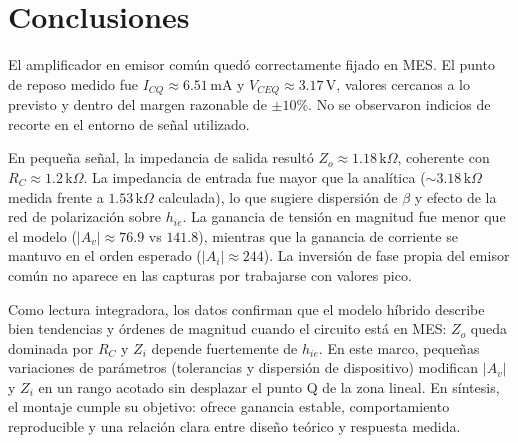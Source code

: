 \chapter{Conclusiones}
El amplificador en emisor común quedó correctamente fijado en MES. El punto de reposo medido fue \(I_{CQ}\approx 6.51\,
\mathrm{mA}\) y \(V_{CEQ}\approx 3.17\,\mathrm{V}\), valores cercanos a lo previsto y dentro del margen razonable de
\(\pm10\%\). No se observaron indicios de recorte en el entorno de señal utilizado.

En pequeña señal, la impedancia de salida resultó \(Z_o\approx 1.18\,\mathrm{k}\Omega\), coherente con \(R_C\approx
1.2\,\mathrm{k}\Omega\). La impedancia de entrada fue mayor que la analítica (\(\sim 3.18\,\mathrm{k}\Omega\) medida
frente a \(1.53\,\mathrm{k}\Omega\) calculada), lo que sugiere dispersión de \(\beta\) y efecto de la red de
polarización sobre \(h_{ie}\). La ganancia de tensión en magnitud fue menor que el modelo (\(|A_v|\approx 76.9\) vs
\(141.8\)), mientras que la ganancia de corriente se mantuvo en el orden esperado (\(|A_i|\approx 244\)). La inversión
de fase propia del emisor común no aparece en las capturas por trabajarse con valores pico.

Como lectura integradora, los datos confirman que el modelo híbrido describe bien tendencias y órdenes de magnitud 
cuando el circuito está en MES: \(Z_o\) queda dominada por \(R_C\) y \(Z_i\) 
depende fuertemente de \(h_{ie}\). En este marco, pequeñas variaciones de parámetros (tolerancias y dispersión de 
dispositivo) modifican \(|A_v|\) y \(Z_i\) en un rango acotado sin desplazar el punto Q de la zona lineal. En síntesis, 
el montaje cumple su objetivo: ofrece ganancia estable, comportamiento reproducible y una relación 
clara entre diseño teórico y respuesta medida.
